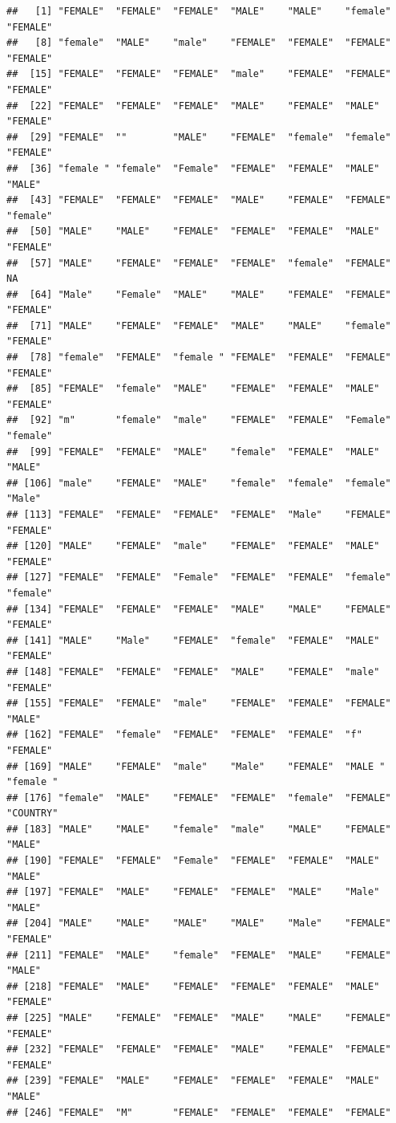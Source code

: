 \documentclass[]{book}
\theoremstyle{definition}
\theoremstyle{definition}
\theoremstyle{definition}
\theoremstyle{remark}
\begin{document}
\begin{verbatim}
##   [1] "FEMALE"  "FEMALE"  "FEMALE"  "MALE"    "MALE"    "female"  "FEMALE" 
##   [8] "female"  "MALE"    "male"    "FEMALE"  "FEMALE"  "FEMALE"  "FEMALE" 
##  [15] "FEMALE"  "FEMALE"  "FEMALE"  "male"    "FEMALE"  "FEMALE"  "FEMALE" 
##  [22] "FEMALE"  "FEMALE"  "FEMALE"  "MALE"    "FEMALE"  "MALE"    "FEMALE" 
##  [29] "FEMALE"  ""        "MALE"    "FEMALE"  "female"  "female"  "FEMALE" 
##  [36] "female " "female"  "Female"  "FEMALE"  "FEMALE"  "MALE"    "MALE"   
##  [43] "FEMALE"  "FEMALE"  "FEMALE"  "MALE"    "FEMALE"  "FEMALE"  "female" 
##  [50] "MALE"    "MALE"    "FEMALE"  "FEMALE"  "FEMALE"  "MALE"    "FEMALE" 
##  [57] "MALE"    "FEMALE"  "FEMALE"  "FEMALE"  "female"  "FEMALE"  NA       
##  [64] "Male"    "Female"  "MALE"    "MALE"    "FEMALE"  "FEMALE"  "FEMALE" 
##  [71] "MALE"    "FEMALE"  "FEMALE"  "MALE"    "MALE"    "female"  "FEMALE" 
##  [78] "female"  "FEMALE"  "female " "FEMALE"  "FEMALE"  "FEMALE"  "FEMALE" 
##  [85] "FEMALE"  "female"  "MALE"    "FEMALE"  "FEMALE"  "MALE"    "FEMALE" 
##  [92] "m"       "female"  "male"    "FEMALE"  "FEMALE"  "Female"  "female" 
##  [99] "FEMALE"  "FEMALE"  "MALE"    "female"  "FEMALE"  "MALE"    "MALE"   
## [106] "male"    "FEMALE"  "MALE"    "female"  "female"  "female"  "Male"   
## [113] "FEMALE"  "FEMALE"  "FEMALE"  "FEMALE"  "Male"    "FEMALE"  "FEMALE" 
## [120] "MALE"    "FEMALE"  "male"    "FEMALE"  "FEMALE"  "MALE"    "FEMALE" 
## [127] "FEMALE"  "FEMALE"  "Female"  "FEMALE"  "FEMALE"  "female"  "female" 
## [134] "FEMALE"  "FEMALE"  "FEMALE"  "MALE"    "MALE"    "FEMALE"  "FEMALE" 
## [141] "MALE"    "Male"    "FEMALE"  "female"  "FEMALE"  "MALE"    "FEMALE" 
## [148] "FEMALE"  "FEMALE"  "FEMALE"  "MALE"    "FEMALE"  "male"    "FEMALE" 
## [155] "FEMALE"  "FEMALE"  "male"    "FEMALE"  "FEMALE"  "FEMALE"  "MALE"   
## [162] "FEMALE"  "female"  "FEMALE"  "FEMALE"  "FEMALE"  "f"       "FEMALE" 
## [169] "MALE"    "FEMALE"  "male"    "Male"    "FEMALE"  "MALE "   "female "
## [176] "female"  "MALE"    "FEMALE"  "FEMALE"  "female"  "FEMALE"  "COUNTRY"
## [183] "MALE"    "MALE"    "female"  "male"    "MALE"    "FEMALE"  "MALE"   
## [190] "FEMALE"  "FEMALE"  "Female"  "FEMALE"  "FEMALE"  "MALE"    "MALE"   
## [197] "FEMALE"  "MALE"    "FEMALE"  "FEMALE"  "MALE"    "Male"    "MALE"   
## [204] "MALE"    "MALE"    "MALE"    "MALE"    "Male"    "FEMALE"  "FEMALE" 
## [211] "FEMALE"  "MALE"    "female"  "FEMALE"  "MALE"    "FEMALE"  "MALE"   
## [218] "FEMALE"  "MALE"    "FEMALE"  "FEMALE"  "FEMALE"  "MALE"    "FEMALE" 
## [225] "MALE"    "FEMALE"  "FEMALE"  "MALE"    "MALE"    "FEMALE"  "FEMALE" 
## [232] "FEMALE"  "FEMALE"  "FEMALE"  "MALE"    "FEMALE"  "FEMALE"  "FEMALE" 
## [239] "FEMALE"  "MALE"    "FEMALE"  "FEMALE"  "FEMALE"  "MALE"    "MALE"   
## [246] "FEMALE"  "M"       "FEMALE"  "FEMALE"  "FEMALE"  "FEMALE"
\end{verbatim}
\end{document}
